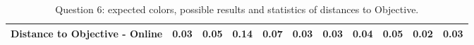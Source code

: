 \begin{table}[H]
{\begin{tabular}{lccccccccccccc}
    \multicolumn{4}{l}{Distance to Objective - Online}                                                                                               & \multicolumn{1}{|c}{0.03}        & \multicolumn{1}{c|}{0.05}    & \multicolumn{1}{|c}{0.14}        & \multicolumn{1}{c|}{0.07}    & \multicolumn{1}{|c}{0.03}       & \multicolumn{1}{c|}{0.03}    & \multicolumn{1}{|c}{0.04}        & \multicolumn{1}{c|}{0.05}    & \multicolumn{1}{|c}{\textbf{0.02}}       & \multicolumn{1}{c|}{0.03}    \\ \hline
    \end{tabular}}
  \caption[Question 6, with expected Results.]{Question 6: expected colors, possible results and statistics of distances to Objective.}
  \vspace{-5pt}
  \label{table:lab_q6_expected}
\end{table}
%

